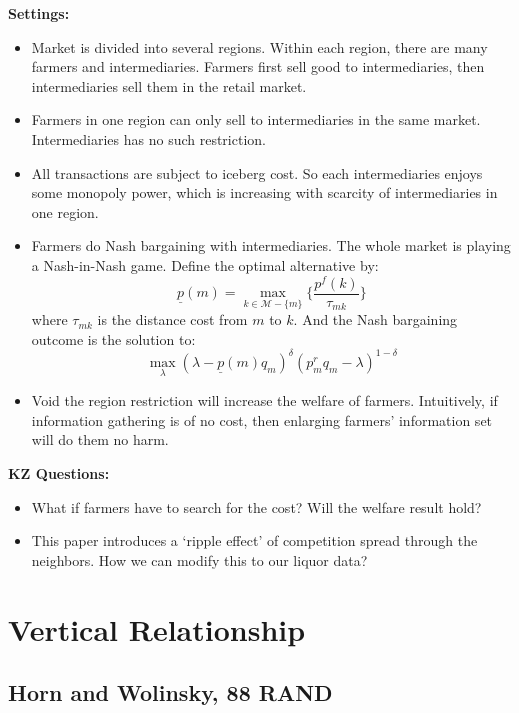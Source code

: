 \documentclass{book}
\theoremstyle{plain}
\theoremstyle{definition}
\begin{document}
\vspace{1em}
\noindent
\textbf{Settings:}
\begin{itemize}
	\item Market is divided into several regions. Within each region, there are many farmers and intermediaries. Farmers first sell good to intermediaries, then intermediaries sell them in the retail market.
	\item Farmers in one region can only sell to intermediaries in the same market. Intermediaries has no such restriction.
	\item All transactions are subject to iceberg cost. So each intermediaries enjoys some monopoly power, which is increasing with scarcity of intermediaries in one region.
	\item Farmers do Nash bargaining with intermediaries. The whole market is playing a Nash-in-Nash game. Define the optimal alternative by:
	\[\underline p(m)=\max_{k\in \mathcal{M}-\{m\}}
	\{\frac{p^f(k)}{\tau_{mk}}\}\]
	where $\tau_{mk}$ is the distance cost from $m$ to $k$.
	And the Nash bargaining outcome is the solution to:
	\[\max_\lambda (\lambda-\underline p(m)q_m)^\delta
	(p_m^rq_m-\lambda)^{1-\delta}\]

	\item Void the region restriction will increase the welfare of farmers. Intuitively, if information gathering is of no cost, then enlarging farmers' information set will do them no harm.
\end{itemize}

\vspace{1em}
\noindent
\textbf{KZ Questions:}
\begin{itemize}
	\item What if farmers have to search for the cost? Will the welfare result hold?

	\item {\color{blue} This paper introduces a `ripple effect' of competition spread through the neighbors. How we can modify this to our liquor data?}
\end{itemize}


\chapter{Vertical Relationship} %
\label{cha:vertical_relationship}

\section{Horn and Wolinsky, 88 RAND} %
\label{sec:horn_and_wolinsky_88_rand}
\end{document}

